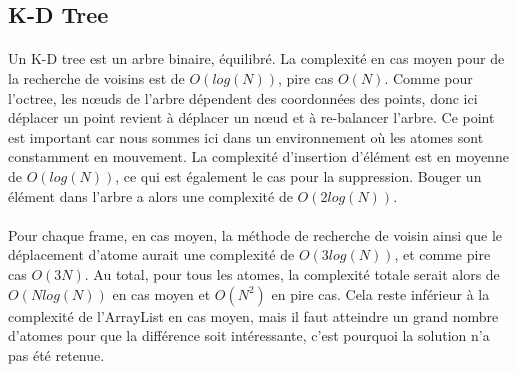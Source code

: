 \subsection{K-D Tree}

\paragraph{}
Un K-D tree est un arbre binaire, équilibré. La complexité en cas moyen pour de
la recherche de voisins est de $O(log(N))$, pire cas $O(N)$. Comme pour
l'octree, les nœuds de l'arbre dépendent des coordonnées des points, donc ici
déplacer un point revient à déplacer un nœud et à re-balancer l'arbre. Ce point
est important car nous sommes ici dans un environnement où les atomes sont
constamment en mouvement.  La complexité d'insertion d'élément est en moyenne
de $O(log(N))$, ce qui est également le cas pour la suppression. Bouger un
élément dans l'arbre a alors une complexité de $O(2log(N))$.

\paragraph{}
Pour chaque frame, en cas moyen, la méthode de recherche de voisin ainsi que le
déplacement d'atome aurait une complexité de $O(3log(N))$, et comme pire cas
$O(3N)$. Au total, pour tous les atomes, la complexité totale serait alors de
$O(Nlog(N))$ en cas moyen et $O(N^2)$ en pire cas. Cela reste inférieur à la
complexité de l'ArrayList en cas moyen, mais il faut atteindre un grand nombre
d'atomes pour que la différence soit intéressante, c'est pourquoi la solution
n'a pas été retenue.
